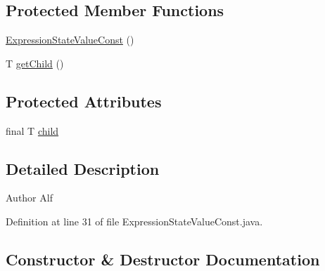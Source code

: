 \subsection*{Protected Member Functions}
\begin{DoxyCompactItemize}
\item 
\hyperlink{classgov_1_1nasa_1_1jpf_1_1inspector_1_1server_1_1expression_1_1expressions_1_1_expression_state_value_const_ad8ca9a619c30b5b5cb76488642c8febb}{Expression\+State\+Value\+Const} ()
\item 
T \hyperlink{classgov_1_1nasa_1_1jpf_1_1inspector_1_1server_1_1expression_1_1_expression_state_unary_operator_a150bac338d6557f79ca185d3f6ad6e06}{get\+Child} ()
\end{DoxyCompactItemize}
\subsection*{Protected Attributes}
\begin{DoxyCompactItemize}
\item 
final T \hyperlink{classgov_1_1nasa_1_1jpf_1_1inspector_1_1server_1_1expression_1_1_expression_state_unary_operator_a66041b1f569a361549e28a00f7ca5f2f}{child}
\end{DoxyCompactItemize}


\subsection{Detailed Description}
\begin{DoxyAuthor}{Author}
Alf 
\end{DoxyAuthor}


Definition at line 31 of file Expression\+State\+Value\+Const.\+java.



\subsection{Constructor \& Destructor Documentation}
